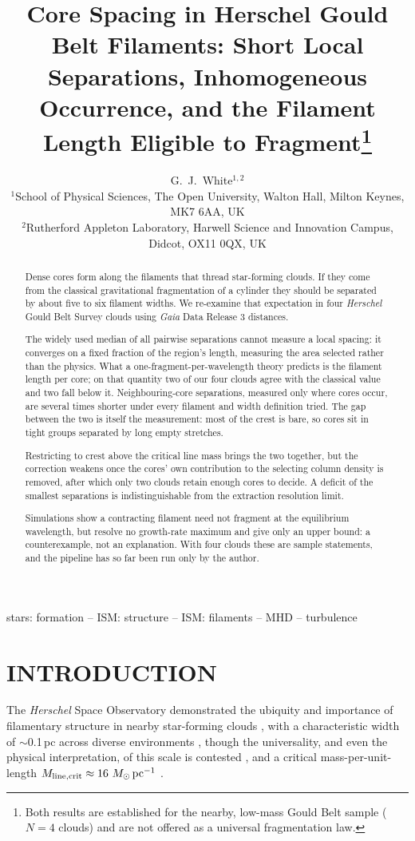 \documentclass[usenatbib,twoside,twocolumn]{mnras}
\title[Core spacing and filament occupancy in HGBS filaments]{Core Spacing in Herschel Gould Belt Filaments: Short Local Separations, Inhomogeneous Occurrence, and the Filament Length Eligible to Fragment\thanks{Both results are established for the nearby, low-mass Gould Belt sample ($N=4$ clouds) and are not offered as a universal fragmentation law.}}
\author[G.~J.~White]{G.~J.~White$^{1,2}$\\
$^{1}$School of Physical Sciences, The Open University, Walton Hall, Milton Keynes, MK7 6AA, UK\\
$^{2}$Rutherford Appleton Laboratory, Harwell Science and Innovation Campus, Didcot, OX11 0QX, UK}
\begin{document}
\maketitle

\begin{abstract}
Dense cores form along the filaments that thread star-forming clouds. If they come from the classical gravitational fragmentation of a cylinder they should be separated by about five to six filament widths. We re-examine that expectation in four \textit{Herschel} Gould Belt Survey clouds using \textit{Gaia} Data Release 3 distances.

The widely used median of all pairwise separations cannot measure a local spacing: it converges on a fixed fraction of the region's length, measuring the area selected rather than the physics. What a one-fragment-per-wavelength theory predicts is the filament length per core; on that quantity two of our four clouds agree with the classical value and two fall below it. Neighbouring-core separations, measured only where cores occur, are several times shorter under every filament and width definition tried. The gap between the two is itself the measurement: most of the crest is bare, so cores sit in tight groups separated by long empty stretches.

Restricting to crest above the critical line mass brings the two together, but the correction weakens once the cores' own contribution to the selecting column density is removed, after which only two clouds retain enough cores to decide. A deficit of the smallest separations is indistinguishable from the extraction resolution limit.

Simulations show a contracting filament need not fragment at the equilibrium wavelength, but resolve no growth-rate maximum and give only an upper bound: a counterexample, not an explanation. With four clouds these are sample statements, and the pipeline has so far been run only by the author.
\end{abstract}

\begin{keywords}
stars: formation -- ISM: structure -- ISM: filaments -- MHD -- turbulence
\end{keywords}

\section{INTRODUCTION}

The \textit{Herschel} Space Observatory demonstrated the ubiquity and importance of filamentary structure in nearby star-forming clouds \citep{Andre2010}, with a characteristic width of $\sim$0.1\,pc across diverse environments \citep{Arzoumanian2011}, though the universality, and even the physical interpretation, of this scale is contested \citep{Panopoulou2017,Panopoulou2022}, and a critical mass-per-unit-length $M_{\rm line,crit}\approx16~M_\odot\,{\rm pc^{-1}}$ \citep{Ostriker1964}.
\end{document}
